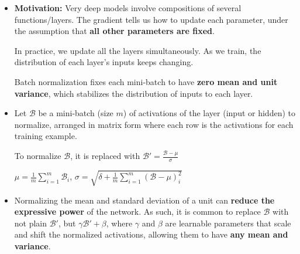 \begin{itemize}
  \item \textbf{Motivation:} Very deep models involve compositions of several functions/layers. The gradient tells us how to update each parameter, under the assumption that \textbf{all other parameters are fixed}.

    In practice, we update all the layers simultaneously. As we train, the distribution of each layer's inputs keeps changing.

    Batch normalization fixes each mini-batch to have \textbf{zero mean and unit variance}, which stabilizes the distribution of inputs to each layer.

  \item Let $\mathcal{B}$ be a mini-batch (size $m$) of activations of the layer (input or hidden) to normalize, arranged in matrix form where each row is the activations for each training example.

    To normalize $\mathcal{B}$, it is replaced with $\mathcal{B}' = \frac{\mathcal{B} - \mu}{\sigma}$

    $\mu = \frac{1}{m} \sum_{i=1}^m \mathcal{B}_i$, $\sigma = \sqrt{\delta + \frac{1}{m} \sum_{i=1}^m (\mathcal{B} - \mu)_i^2}$

  \item Normalizing the mean and standard deviation of a unit can \textbf{reduce the expressive power} of the network. As such, it is common to replace $\mathcal{B}$ with not plain $\mathcal{B}'$, but $\gamma \mathcal{B}' + \beta$, where $\gamma$ and $\beta$ are learnable parameters that scale and shift the normalized activations, allowing them to have \textbf{any mean and variance}.
\end{itemize}
